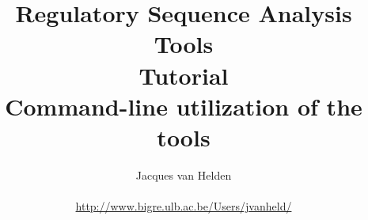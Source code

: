 \documentclass{book}
\begin{document}
\title{Regulatory Sequence Analysis Tools \\
Tutorial \\
Command-line utilization of the tools}

\author{
	Jacques van Helden \\
	 \\
	\url{http://www.bigre.ulb.ac.be/Users/jvanheld/} \\
	\bigre 
}

\maketitle

\newpage
\tableofcontents
\newpage

\newpage


\newpage


\newpage


\newpage


\newpage


\newpage


\newpage


\newpage


\newpage


\newpage


\newpage


\newpage


\newpage


\newpage


\newpage


\newpage


\newpage




% 

% 

\newpage


\newpage


\newpage


\newpage

\end{document}

